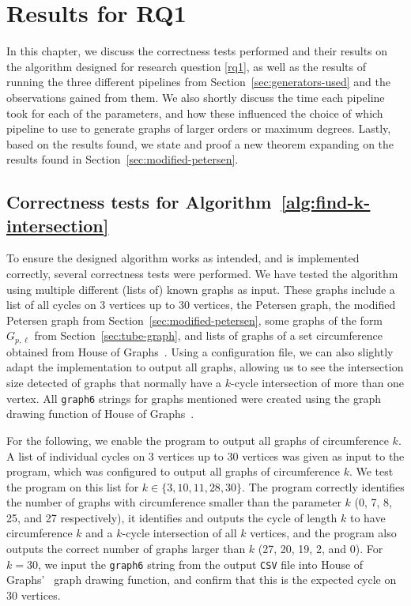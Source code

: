 \chapter{Results for RQ1}
\label{cha:results}

In this chapter, we discuss the correctness tests performed and their results on the algorithm designed for research question \ref{rq1}, as well as the results of running the three different pipelines from Section~\ref{sec:generators-used} and the observations gained from them. We also shortly discuss the time each pipeline took for each of the parameters, and how these influenced the choice of which pipeline to use to generate graphs of larger orders or maximum degrees. Lastly, based on the results found, we state and proof a new theorem expanding on the results found in Section~\ref{sec:modified-petersen}.

\section{Correctness tests for Algorithm~\ref{alg:find-k-intersection}}
\label{sec:1-correct}

To ensure the designed algorithm works as intended, and is implemented correctly, several correctness tests were performed. We have tested the algorithm using multiple different (lists of) known graphs as input. These graphs include a list of all cycles on 3 vertices up to 30 vertices, the Petersen graph, the modified Petersen graph from Section~\ref{sec:modified-petersen}, some graphs of the form $G_{p,\ell}$ from Section~\ref{sec:tube-graph}, and lists of graphs of a set circumference obtained from House of Graphs~\cite{data:houseofgraphs}. Using a configuration file, we can also slightly adapt the implementation to output all graphs, allowing us to see the intersection size detected of graphs that normally have a $k$-cycle intersection of more than one vertex. All \texttt{graph6} strings for graphs mentioned were created using the graph drawing function of House of Graphs~\cite{data:houseofgraphs}.

For the following, we enable the program to output all graphs of circumference $k$. A list of individual cycles on 3 vertices up to 30 vertices was given as input to the program, which was configured to output all graphs of circumference $k$. We test the program on this list for $k\in\{3,10,11,28,30\}$. The program correctly identifies the number of graphs with circumference smaller than the parameter $k$ (0, 7, 8, 25, and 27 respectively), it identifies and outputs the cycle of length $k$ to have circumference $k$ and a $k$-cycle intersection of all $k$ vertices, and the program also outputs the correct number of graphs larger than $k$ (27, 20, 19, 2, and 0). For $k=30$, we input the \texttt{graph6} string from the output \texttt{CSV} file into House of Graphs'~\cite{data:houseofgraphs} graph drawing function, and confirm that this is the expected cycle on 30 vertices.


